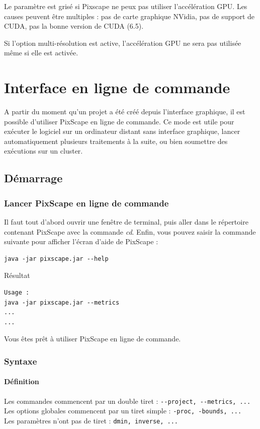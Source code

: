 \documentclass{report}
\begin{document}
Le paramètre est grisé si Pixscape ne peux pas utiliser l'accélération GPU. Les causes peuvent être multiples : pas de carte graphique NVidia, pas de support de CUDA, pas la bonne version de CUDA (6.5).

Si l'option multi-résolution est active, l'accélération GPU ne sera pas utilisée même si elle est activée.


\chapter{Interface en ligne de commande}
\label{cli}

A partir du moment qu'un projet a été créé depuis l'interface graphique, il est possible d'utiliser PixScape en ligne de commande. Ce mode est utile pour exécuter le logiciel sur un ordinateur distant sans interface graphique, lancer automatiquement plusieurs traitements à la suite, ou bien soumettre des exécutions sur un cluster.

\section{Démarrage}

\subsection{Lancer PixScape en ligne de commande}
Il faut tout d'abord ouvrir une fenêtre de terminal, puis aller dans le répertoire contenant PixScape avec la commande \textit{cd}.
Enfin, vous pouvez saisir la commande suivante pour afficher l'écran d'aide de PixScape :
\begin{Verbatim}
java -jar pixscape.jar --help
\end{Verbatim}
Résultat
\begin{Verbatim}
Usage :
java -jar pixscape.jar --metrics
...
...
\end{Verbatim}
Vous êtes prêt à utiliser PixScape en ligne de commande.

\subsection{Syntaxe}
\subsubsection{Définition}
Les commandes commencent par un double tiret : \verb|--project, --metrics, ...|\\
Les options globales commencent par un tiret simple : \verb|-proc, -bounds, ...|\\
Les paramètres n'ont pas de tiret : \verb|dmin, inverse, ...|
\end{document}

